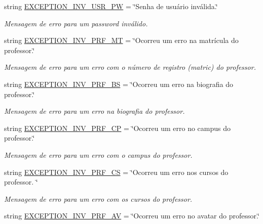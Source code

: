 \begin{DoxyCompactItemize}
string \hyperlink{namespaceELO_1_1lang_1_1pt__br_a65a3090ed44928d83e54554e85a00417}{E\-X\-C\-E\-P\-T\-I\-O\-N\-\_\-\-I\-N\-V\-\_\-\-U\-S\-R\-\_\-\-P\-W} = \char`\"{}Senha de usuário inválida.\char`\"{}
\begin{DoxyCompactList}\small\item\em Mensagem de erro para um password inválido. \end{DoxyCompactList}\item 
string \hyperlink{namespaceELO_1_1lang_1_1pt__br_ad235382693cbb6a1e0e43f7d27482780}{E\-X\-C\-E\-P\-T\-I\-O\-N\-\_\-\-I\-N\-V\-\_\-\-P\-R\-F\-\_\-\-M\-T} = \char`\"{}Ocorreu um erro na matrícula do professor.\char`\"{}
\begin{DoxyCompactList}\small\item\em Mensagem de erro para um erro com o número de registro (matric) do professor. \end{DoxyCompactList}\item 
string \hyperlink{namespaceELO_1_1lang_1_1pt__br_affe6f924acc217d97dcbf77c664f8605}{E\-X\-C\-E\-P\-T\-I\-O\-N\-\_\-\-I\-N\-V\-\_\-\-P\-R\-F\-\_\-\-B\-S} = \char`\"{}Ocorreu um erro na biografia do professor.\char`\"{}
\begin{DoxyCompactList}\small\item\em Mensagem de erro para um erro na biografia do professor. \end{DoxyCompactList}\item 
string \hyperlink{namespaceELO_1_1lang_1_1pt__br_af69f20acf736c63a8eeddb4c69f7a1d0}{E\-X\-C\-E\-P\-T\-I\-O\-N\-\_\-\-I\-N\-V\-\_\-\-P\-R\-F\-\_\-\-C\-P} = \char`\"{}Ocorreu um erro no campus do professor.\char`\"{}
\begin{DoxyCompactList}\small\item\em Mensagem de erro para um erro com o campus do professor. \end{DoxyCompactList}\item 
string \hyperlink{namespaceELO_1_1lang_1_1pt__br_af8c2a3e201aee7c3d26f14cd0b049b6f}{E\-X\-C\-E\-P\-T\-I\-O\-N\-\_\-\-I\-N\-V\-\_\-\-P\-R\-F\-\_\-\-C\-S} = \char`\"{}Ocorreu um erro nos cursos do professor. \char`\"{}
\begin{DoxyCompactList}\small\item\em Mensagem de erro para um erro com os cursos do professor. \end{DoxyCompactList}\item 
string \hyperlink{namespaceELO_1_1lang_1_1pt__br_a715248b8b5f4866134fdab66594756fa}{E\-X\-C\-E\-P\-T\-I\-O\-N\-\_\-\-I\-N\-V\-\_\-\-P\-R\-F\-\_\-\-A\-V} = \char`\"{}Ocorreu um erro no avatar do professor.\char`\"{}

\end{DoxyCompactItemize}
